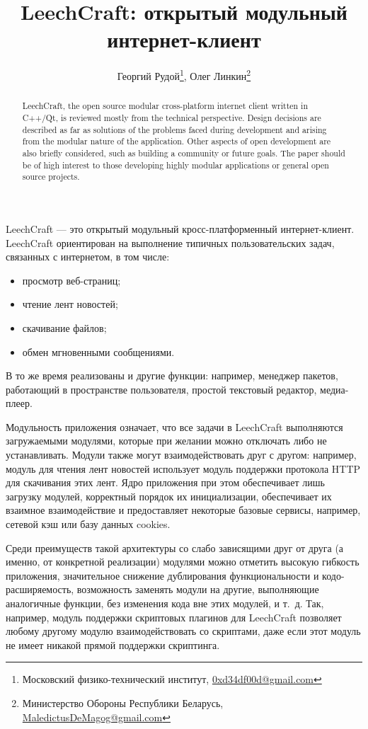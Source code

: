 \documentclass[10pt, a5paper]{article}
\begin{document}
\title{LeechCraft: открытый модульный интернет-клиент}

\author{Георгий Рудой\footnote{Московский физико-технический институт, \url{0xd34df00d@gmail.com}}, Олег Линкин\footnote{Министерство Обороны Республики Беларусь, \url{MaledictusDeMagog@gmail.com}}}
\date{}
\maketitle

\begin{abstract}
LeechCraft, the open source modular
cross-platform internet client written in C++/Qt, is reviewed mostly from the
technical perspective. Design decisions are described as far as solutions of
the problems faced during development and arising from the modular
nature of the application. Other aspects of open development are also
briefly considered, such as building a community or future goals. 
The paper should be of high interest to those developing highly modular
applications or general open source projects.
\end{abstract}

LeechCraft --- это открытый модульный кросс-платформенный
интернет-клиент. LeechCraft ориентирован на выполнение типичных
пользовательских задач, связанных с интернетом, в том числе:
\begin{itemize}
	\item просмотр веб-страниц;
	\item чтение лент новостей;
	\item скачивание файлов;
	\item обмен мгновенными сообщениями. 
\end{itemize}
В то же время реализованы и другие функции: например, менеджер
пакетов, работающий в пространстве пользователя, простой текстовый
редактор, медиа-плеер.

Модульность приложения означает, что все задачи в LeechCraft
выполняются загружаемыми модулями, которые при желании можно отключать
либо не устанавливать. Модули также могут взаимодействовать друг с
другом: например, модуль для чтения лент новостей использует модуль
поддержки протокола HTTP для скачивания этих лент. Ядро приложения при
этом обеспечивает лишь загрузку модулей, корректный порядок их
инициализации, обеспечивает их взаимное взаимодействие и предоставляет
некоторые базовые сервисы, например, сетевой кэш или базу данных
cookies.

Среди преимуществ такой архитектуры со слабо зависящими друг от друга
(а именно, от конкретной реализации) модулями можно отметить высокую
гибкость приложения, значительное снижение дублирования
функциональности и кодо-расширяемость, возможность заменять модули на
другие, выполняющие аналогичные функции, без изменения кода вне этих
модулей, и т.~д. Так, например, модуль поддержки скриптовых плагинов
для LeechCraft позволяет любому другому модулю взаимодействовать со
скриптами, даже если этот модуль не имеет никакой прямой поддержки скриптинга.
\end{document}
